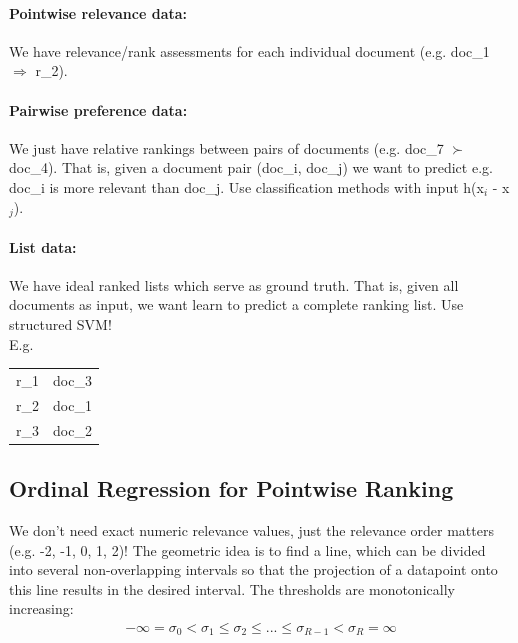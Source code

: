 \documentclass[a4paper,11pt]{article}
\begin{document}
\begin{multicols}{2}
\paragraph{Pointwise relevance data:} We have relevance/rank assessments for each individual document (e.g. doc\_1 $\Rightarrow$ r\_2). 

\paragraph{Pairwise preference data:} We just have relative rankings between pairs of documents (e.g. doc\_7 $\succ$ doc\_4).
That is, given a document pair (doc\_i, doc\_j) we want to predict e.g. doc\_i is more relevant than doc\_j. Use classification methods with input h(x$_i$ - x$_j$).

\paragraph{List data:} We have ideal ranked lists which serve as ground truth. That is, given all documents as input, we want learn to predict a complete ranking list. Use structured SVM!\\
E.g. 
\begin{tabular}{l|c}
\hline
r\_1  &  doc\_3  \\
r\_2 &  doc\_1   \\
r\_3 & doc\_2 \\
\end{tabular}

\subsection{Ordinal Regression for Pointwise Ranking} We don't need exact numeric relevance values, just the relevance order matters (e.g. -2, -1, 0, 1, 2)! The geometric idea is to find a line, which can be divided into several non-overlapping intervals so that the projection of a datapoint onto this line results in the desired interval. The thresholds are monotonically increasing:
\begin{align*}
  - \infty = \sigma_0 < \sigma_1 \leq \sigma_2 \leq ... \leq \sigma_{R-1} < \sigma_R = \infty
\end{align*}


\end{multicols}
\end{document}
